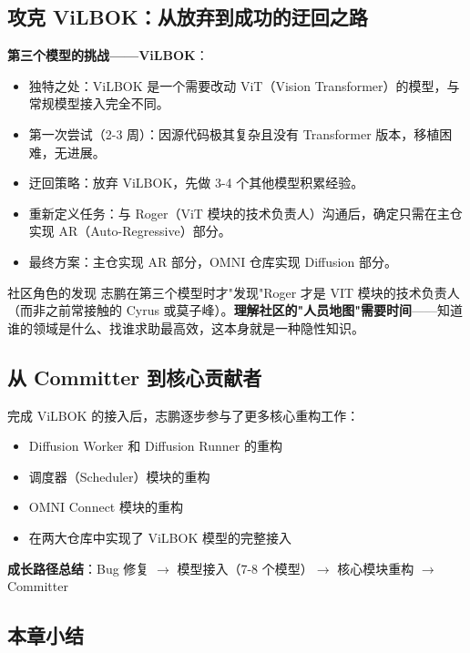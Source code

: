 \documentclass[a4paper]{article}
\begin{document}
\subsection{攻克 ViLBOK：从放弃到成功的迂回之路}

\textbf{第三个模型的挑战——ViLBOK}：

\begin{itemize}
\item 独特之处：ViLBOK 是一个需要改动 ViT（Vision Transformer）的模型，与常规模型接入完全不同。
\item 第一次尝试（2-3 周）：因源代码极其复杂且没有 Transformer 版本，移植困难，无进展。
\item 迂回策略：放弃 ViLBOK，先做 3-4 个其他模型积累经验。
\item 重新定义任务：与 Roger（ViT 模块的技术负责人）沟通后，确定只需在主仓实现 AR（Auto-Regressive）部分。
\item 最终方案：主仓实现 AR 部分，OMNI 仓库实现 Diffusion 部分。
\end{itemize}

\begin{knowledgebox}{社区角色的发现}
志鹏在第三个模型时才"发现"Roger 才是 VIT 模块的技术负责人（而非之前常接触的 Cyrus 或莫子峰）。\textbf{理解社区的"人员地图"需要时间}——知道谁的领域是什么、找谁求助最高效，这本身就是一种隐性知识。
\end{knowledgebox}

\subsection{从 Committer 到核心贡献者}

完成 ViLBOK 的接入后，志鹏逐步参与了更多核心重构工作：

\begin{itemize}
\item Diffusion Worker 和 Diffusion Runner 的重构
\item 调度器（Scheduler）模块的重构
\item OMNI Connect 模块的重构
\item 在两大仓库中实现了 ViLBOK 模型的完整接入
\end{itemize}

\textbf{成长路径总结}：Bug 修复 $\rightarrow$ 模型接入（7-8 个模型）$\rightarrow$ 核心模块重构 $\rightarrow$ Committer

\subsection{本章小结}
\end{document}
